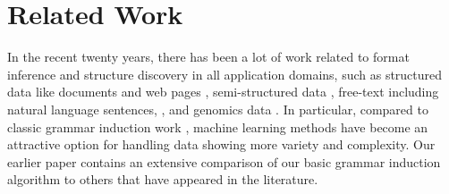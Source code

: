 \section{Related Work}\label{sec:related}

In the recent twenty years, there has been a lot of work related to
format inference and structure discovery in all application domains,
such as structured data like \xml{} documents
\cite{bex+:dtd-inference,garofalakis+:xtract} and web pages
\cite{kushmerick-phd1997,arasu+:sigmod03,hong:thesis}, semi-structured data
\cite{soderland:whisk,Pinto+:texttables}, free-text including natural
language sentences, \cite{borkar+:text-segmentation,Heeman99:speech,Chen95bayesiangrammar}, and
genomics data \cite{kulp96generalized}. In particular, compared to classic grammar induction work
\cite{vidal:gisurvey,gold:inference,angluin:revesible-language-inference},
machine learning methods have become an attractive option for handling
data showing more variety and complexity. Our earlier paper contains an
extensive comparison of our basic grammar induction
algorithm to others that have appeared in the literature.


